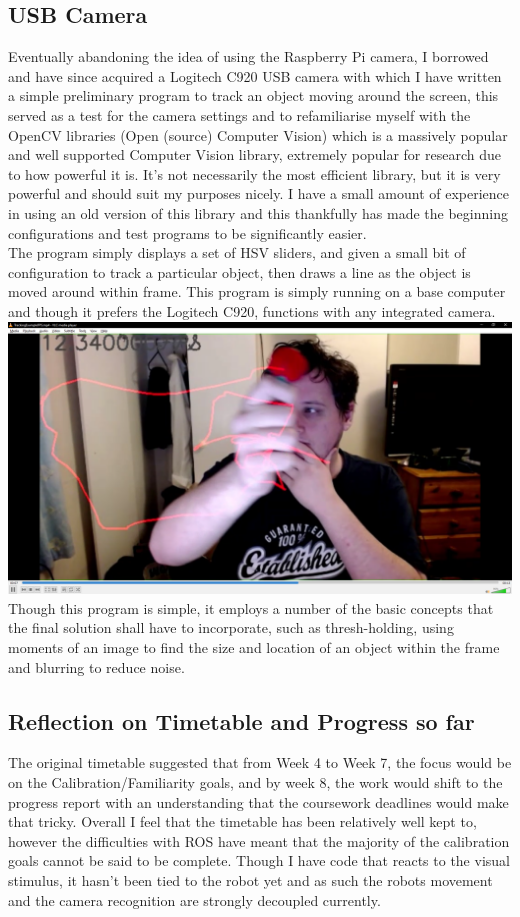 \documentclass[10pt,a4paper]{report}
\begin{document}
		\subsection*{USB Camera}
			Eventually abandoning the idea of using the Raspberry Pi camera, I borrowed and have since acquired a Logitech C920 USB camera with which I have written a simple preliminary program to track an object moving around the screen, this served as a test for the camera settings and to refamiliarise myself with the OpenCV libraries (Open (source) Computer Vision)  which is a massively popular and well supported Computer Vision library, extremely popular for research due to how powerful it is. It's not necessarily the most efficient library, but it is very powerful and should suit my purposes nicely. I have a small amount of experience in using an old version of this library and this thankfully has made the beginning configurations and test programs to be significantly easier. \\
			The program simply displays a set of HSV sliders, and given a small bit of configuration to track a particular object, then draws a line as the object is moved around within frame. This program is simply running on a base computer and though it prefers the Logitech C920, functions with any integrated camera. \\
			\includegraphics[scale=0.25]{TrackingExampleScreenshot} \\
			Though this program is simple, it employs a number of the basic concepts that the final solution shall have to incorporate, such as thresh-holding, using moments of an image to find the size and location of an object within the frame and blurring to reduce noise. 
		\subsection*{Reflection on Timetable and Progress so far}
			The original timetable suggested that from Week 4 to Week 7, the focus would be on the Calibration/Familiarity goals, and by week 8, the work would shift to the progress report with an understanding that the coursework deadlines would make that tricky. Overall I feel that the timetable has been relatively well kept to, however the difficulties with ROS have meant that the majority of the calibration goals cannot be said to be complete. Though I have code that reacts to the visual stimulus, it hasn't been tied to the robot yet and as such the robots movement and the camera recognition are strongly decoupled currently. \\
\end{document}
